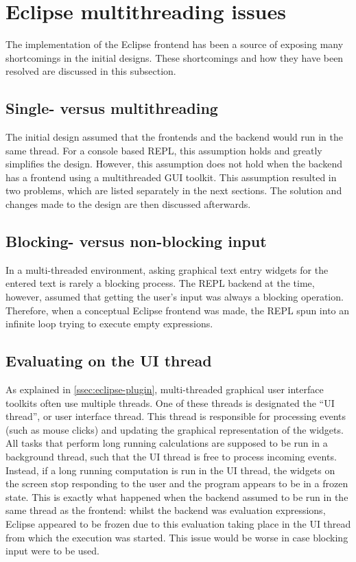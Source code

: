 \section{Eclipse multithreading issues}
\label{sec:eclipse-multithread}

The implementation of the Eclipse frontend has been a source of exposing many
shortcomings in the initial designs. These shortcomings and how they have been
resolved are discussed in this subsection.

\subsection{Single- versus multithreading}

The initial design assumed that the frontends and the backend would run in the
same thread. For a console based REPL, this assumption holds and greatly
simplifies the design. However, this assumption does not hold when the backend
has a frontend using a multithreaded GUI toolkit. This
assumption resulted in two problems, which are listed separately in the next
sections. The solution and changes made to the design are then discussed
afterwards.

\subsection{Blocking- versus non-blocking input}

In a multi-threaded environment, asking graphical text entry widgets for the
entered text is rarely a blocking process. The REPL backend at the time,
however, assumed that getting the user's input was always a blocking operation.
Therefore, when a conceptual Eclipse frontend was made, the REPL spun into an
infinite loop trying to execute empty expressions.

\subsection{Evaluating on the UI thread}

As explained in \cref{ssec:eclipse-plugin}, multi-threaded graphical user
interface toolkits often use multiple threads. One of these threads is
designated the ``UI thread'', or user interface thread. This thread is
responsible for processing events (such as mouse clicks) and updating the
graphical representation of the widgets. All tasks that perform long running
calculations are supposed to be run in a background thread, such that the UI
thread is free to process incoming events. Instead, if a long running
computation is run in the UI thread, the widgets on the screen stop responding
to the user and the program appears to be in a frozen state.  This is exactly
what happened when the backend assumed to be run in the same thread as the
frontend: whilst the backend was evaluation expressions, Eclipse appeared to be
frozen due to this evaluation taking place in the UI thread from which the
execution was started. This issue would be worse in case blocking input
were to be used.

